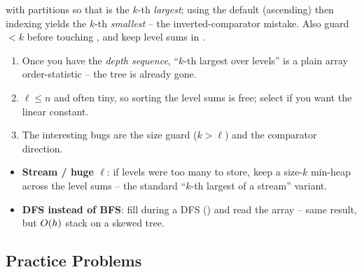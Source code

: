 
\begin{warningbox}
 with  partitions so that  is the
$k$-th \emph{largest}; using the default (ascending)  then indexing
\code{[k-1]} yields the $k$-th \emph{smallest} -- the inverted-comparator mistake. Also guard
 $< k$ before touching \code{[k-1]}, and keep level sums in .
\end{warningbox}

\begin{insightbox}
\begin{enumerate}[nosep, leftmargin=1.6em]
  \item Once you have the \emph{depth sequence}, ``$k$-th largest over levels'' is a plain
        array order-statistic -- the tree is already gone.
  \item $\ell \le n$ and often tiny, so sorting the level sums is free; select if you want the
        linear constant.
  \item The interesting bugs are the size guard ($k>\ell$) and the comparator direction.
\end{enumerate}
\end{insightbox}

\begin{hardeningbox}
\begin{itemize}[nosep, leftmargin=1.4em]
  \item \textbf{Stream / huge $\ell$}: if levels were too many to store, keep a size-$k$
        min-heap across the level sums -- the standard ``$k$-th largest of a stream'' variant.
  \item \textbf{DFS instead of BFS}: fill  during a DFS ()
        and read the array -- same result, but $O(h)$ stack on a skewed tree.
\end{itemize}
\end{hardeningbox}

\subsection{Practice Problems}

